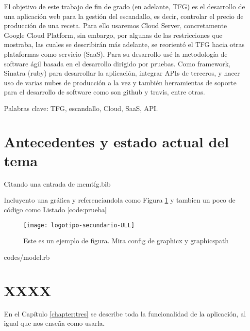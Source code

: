 El objetivo de este trabajo de fin de grado (en adelante, TFG) es el desarrollo de una aplicación web para la gestión del escandallo, es decir, controlar el precio de producción de una receta. Para ello usaremos Cloud Server, concretamente Google Cloud Platform, sin embargo, por algunas de las restricciones que mostraba, las cuales se describirán más adelante, se reorientó el TFG hacia otras plataformas como servicio (SaaS). Para su desarrollo usé la metodología de software ágil basada en el desarrollo dirigido por pruebas. Como framework, Sinatra (ruby) para desarrollar la aplicación, integrar APIs de terceros, y hacer uso de varias nubes de producción a la vez y también herramientas de soporte para el desarrollo de software como son github y travis, entre otras.

Palabras clave: TFG, escandallo, Cloud, SaaS, API.
\section{Antecedentes y estado actual del tema}
\label{1:sec:1}


Citando una entrada de memtfg.bib \cite{URL:GitHub}

Incluyento una gráfica y referenciandola como Figura \ref{fig:prueba} y tambien un poco de código como Listado \ref{code:prueba}

\begin{figure}[t]
  \begin{center}
    \texttt{[image: logotipo-secundario-ULL]}
  \end{center}
  \caption{Este es un ejemplo de figura. Mira config de graphicx y  graphicspath}
  \label{fig:prueba}
\end{figure}


                 {codes/model.rb}


\section{XXXX}
\label{1:sec:2}

En el Capítulo \ref{chapter:tres}
se describe toda la funcionalidad de la aplicación, al igual que nos enseña como usarla.\\
